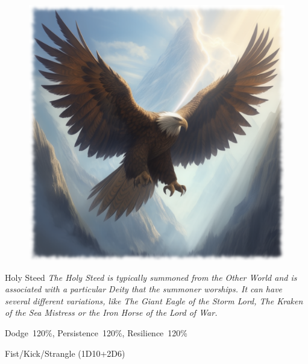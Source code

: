 \begin{figure}[h]
\begin{center}
\includegraphics[scale=0.24]{img/ai-images/giant-eagle.png}
\end{center}
\end{figure}
\begin{monsterbox}{Holy Steed}
	\label{monster:holy-steed}
	\textit{The Holy Steed is typically summoned from the Other World and is associated with a particular Deity that the summoner worships. It can have several different variations, like The Giant Eagle of the Storm Lord, The Kraken of the Sea Mistress or the Iron Horse of the Lord of War.}\\
	\rpghline
	\basics[%
        hitpoints  = 25,
	majorwound = 13,
	damagemodifier = +2D6,
	powerpoints = 18,
	movementrate = 20m,
	armor = Special (6AP),
	plunderrating = 0
	]
	\rpghline%
	\stats[ %
		STR = 30,
		CON = 20,
		DEX = 18,
		SIZ = 30,
		INT = 18,
		POW = 18,
		CHA = 18
	]
	\rpghline%
	\begin{rpg-monsteraction}[Resistances]
		Dodge~120\%, Persistence~120\%, Resilience~120\%
	\end{rpg-monsteraction}
	\begin{rpg-monsteraction}
		Fist/Kick/Strangle (1D10+2D6)
	\end{rpg-monsteraction}
\end{monsterbox}

